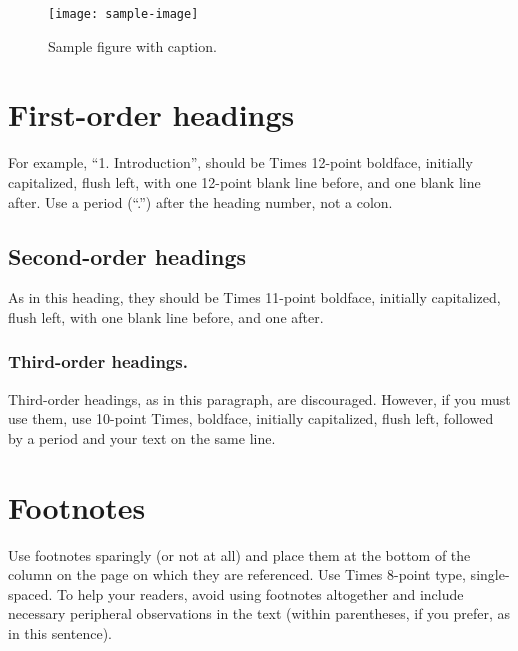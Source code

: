 \documentclass[10pt]{article}
\begin{document}
\begin{figure}[thb]
    \centering
	\texttt{[image: sample-image]}
	\caption{Sample figure with caption.}
	\label{fig: sample-figure}       %
\end{figure}

\section{First-order headings}

For example, “1. Introduction”, should be Times 12-point boldface, initially capitalized, flush left, with one 12-point blank line before, and one blank line after. Use a period (“.”) after the heading number, not a colon. 

\subsection{Second-order headings}
 
As in this heading, they should be Times 11-point boldface, initially capitalized, flush left, with one blank line before, and one after. 

\subsubsection{Third-order headings. }

Third-order headings, as in this paragraph, are discouraged. However, if you must use them, use 10-point Times, boldface, initially capitalized, flush left, followed by a period and your text on the same line. 

\section{Footnotes}

Use footnotes sparingly (or not at all) and place them at the bottom of the column on the page on which they are referenced. Use Times 8-point type, single-spaced. To help your readers, avoid using footnotes altogether and include necessary peripheral observations in the text (within parentheses, if you prefer, as in this sentence). 

\end{document}
